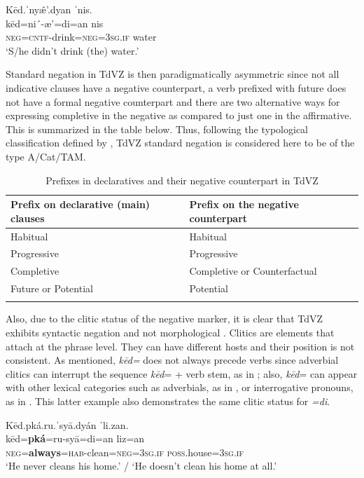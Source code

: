 \documentclass[output=paper,colorlinks=true, citecolor=brown]{langscibook}
\begin{document}
\ea\label{ex:zap:14} 
    \glll Kēd.ˈny\^{æ}’.dyan ˈnis.\\ 
           kēd=ni´-æ’=di=an nis\\
            \textsc{neg}=\textsc{cntf{}-}drink=\textsc{neg}=\textsc{3sg.if} water\\
    \glt   ‘S/he didn’t drink (the) water.’ 
\z 


Standard negation in TdVZ is then paradigmatically asymmetric since not all indicative clauses have a negative counterpart, a verb prefixed with future does not have a formal negative counterpart and there are two alternative ways for expressing completive in the negative as compared to just one in the affirmative. This is summarized in the table below. Thus, following the typological classification defined by \citet{Miestamo2005}, TdVZ standard negation is considered here to be of the type A/Cat/TAM.

\begin{table}
    \begin{tabularx}{\textwidth}{Xl}
        \lsptoprule
        {Prefix on declarative (main) clauses} & {Prefix on the negative counterpart}\\
        \midrule 
        {Habitual} & {Habitual}\\
        {Progressive} & {Progressive}\\
        {Completive}  & {Completive or Counterfactual}\\
        {Future or Potential} & {Potential}\\
        \lspbottomrule
    \end{tabularx}
\caption{Prefixes in declaratives and their negative counterpart in TdVZ}
\label{tab:zap:1}
\end{table}

Also, due to the clitic status of the negative marker, it is clear that TdVZ exhibits syntactic negation and not morphological \citep{Dahl1979}. Clitics are elements that attach at the phrase level. They can have different hosts and their position is not consistent. As mentioned, \textit{kēd=} does not always precede verbs since adverbial clitics can interrupt the sequence \textit{kēd}= + verb stem, as in ; also, \textit{kēd}= can appear with other lexical categories such as adverbials, as in , or interrogative pronouns, as in . This latter example also demonstrates the same clitic status for \textit{=di}. 

\ea\label{ex:zap:15} 
    \glll Kēd.pká.ru.ˈsyā.dyán ˈli.zan.\\ 
          kēd=\textbf{pká}=ru-syā=di=an liz=an\\
          \textsc{neg}=\textbf{always}=\textsc{hab}{}-clean=\textsc{neg}=\textsc{3sg.if} \textsc{poss}.house=\textsc{3sg.if}\\
    \glt ‘He never cleans his home.’ / ‘He doesn’t clean his home at all.’
\z 
\end{document}
